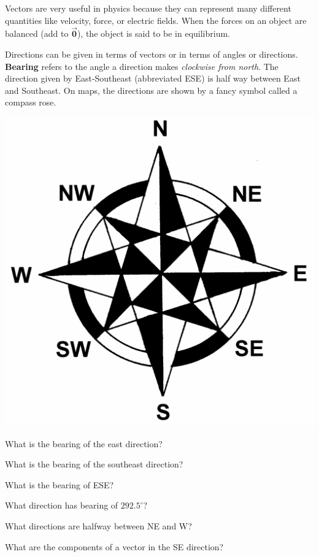 \begin{info} Vectors are very useful in physics because they can represent many different quantities like velocity, force, or electric fields. When the forces on an object are balanced (add to $\vec{\textbf{0}}$), the object is said to be in equilibrium.

Directions can be given in terms of vectors or in terms of angles or directions. \textbf{Bearing} refers to the angle a direction makes \emph{clockwise from north}. The direction given by East-Southeast (abbreviated ESE) is half way between East and Southeast. On maps, the directions are shown by a fancy symbol called a compass rose.

\begin{center} \includegraphics[scale=.1]{comprose.png} \end{center}
\end{info}

\bq \be
\item What is the bearing of the east direction?
\item What is the bearing of the southeast direction?
\item What is the bearing of ESE?
\item What direction has bearing of $292.5^\circ$?
\item What directions are halfway between NE and W?
\item What are the components of a vector in the SE direction?
\ee \eq


